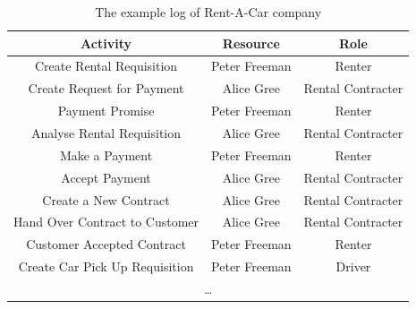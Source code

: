 \begin{table}[ht!]
\centering
\begin{tabular}{ | c | c | c | }
\hline
    \textbf{Activity} & \textbf{Resource} & \textbf{Role} \\ \hline
    Create Rental  Requisition & Peter Freeman & Renter \\ \hline
    Create Request for Payment & Alice Gree & Rental Contracter \\ \hline
    Payment Promise & Peter Freeman & Renter \\ \hline
    Analyse Rental Requisition & Alice Gree & Rental Contracter \\ \hline
    Make a Payment & Peter Freeman & Renter \\ \hline
    Accept Payment & Alice Gree & Rental Contracter \\ \hline
    Create a New Contract & Alice Gree & Rental Contracter \\ \hline
    Hand Over Contract to Customer & Alice Gree & Rental Contracter \\ \hline
    Customer Accepted Contract & Peter Freeman & Renter \\ \hline
    Create Car Pick Up  Requisition & Peter Freeman & Driver \\ \hline
    \multicolumn{3}{|c|}{\dots} \\ \hline
    
\end{tabular}
\caption{The example log of Rent-A-Car company}
\label{tab:rac-log}
  

\end{table}

